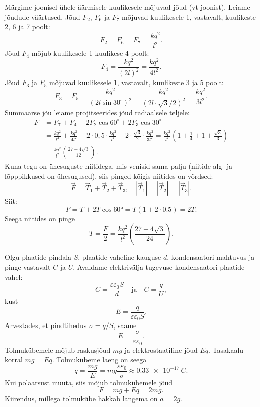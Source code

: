 \documentclass[10pt, twoside]{article}
\begin{document}
{Märgime joonisel ühele äärmisele kuulikesele mõjuvad jõud (vt joonist). Leiame jõudude väärtused. Jõud $F_2$, $F_6$ ja $F_7$ mõjuvad kuulikesele 1, vastavalt, kuulikeste 2, 6 ja 7 poolt:
\[
F_2 = F_6 = F_7 = \frac{kq^2}{l^2}.
\]
Jõud $F_4$ mõjub kuulikesele 1 kuulikese 4 poolt:
\[
F_{4}=\frac{k q^{2}}{(2 l)^{2}}=\frac{k q^{2}}{4 l^{2}}.
\]
Jõud $F_3$ ja $F_5$ mõjuvad kuulikesele 1, vastavalt, kuulikeste 3 ja 5 poolt:
\[
F_{3}=F_{5}=\frac{k q^{2}}{\left(2 l \sin 30^{\circ}\right)^{2}}=\frac{k q^{2}}{(2 l \cdot \sqrt{3} / 2)^{2}}=\frac{k q^{2}}{3 l^{2}}.
\]
Summaarse jõu leiame projitseerides jõud radiaalsele teljele:
\[
\begin{aligned}
F&=F_{7}+F_{4}+2 F_{2} \cos 60^{\circ}+2 F_{3} \cos 30^{\circ}\\
&=\frac{k q^{2}}{l^{2}}+\frac{k q^{2}}{4 l^{2}}+2 \cdot 0,5 \cdot \frac{k q^{2}}{l^{2}}+2 \cdot \frac{\sqrt{3}}{2} \cdot \frac{k q^{2}}{3 l^{2}}=\frac{k q^{2}}{l^{2}}\left(1+\frac{1}{4}+1+\frac{\sqrt{3}}{3}\right)\\
&=\frac{k q^{2}}{l^{2}}\left(\frac{27+4 \sqrt{3}}{12}\right).
\end{aligned}
\]
Kuna tegu on ühesuguste niitidega, mis venisid sama palju (niitide alg- ja lõpppikkused on ühesugused), siis pinged kõigis niitides on võrdsed: 
\[
\vec{F}=\vec{T}_{1}+\vec{T}_{2}+\vec{T}_{3}, \quad\left|\vec{T}_{1}\right|=\left|\vec{T}_{2}\right|=\left|\vec{T}_{3}\right|.
\]
Siit:
\[
F = T + 2T \cos \ang{60} = T (\num{1} + \num{2} \cdot \num{0,5}) = 2T.
\]
Seega niitides on pinge
\[
T=\frac{F}{2}=\frac{k q^{2}}{l^{2}}\left(\frac{27+4 \sqrt{3}}{24}\right).
\]
\probend
\bigskip


\solu
Olgu plaatide pindala $S$, plaatide vaheline kauguse $d$, kondensaatori mahtuvus ja pinge vastavalt $C$ ja $U$. Avaldame elektrivälja tugevuse kondensaatori plaatide vahel:
\[
C=\frac{\varepsilon \varepsilon_{0} S}{d} \quad \text{ja} \quad C=\frac{q}{U},
\]
kust
\[
E=\frac{q}{\varepsilon \varepsilon_{0} S}.
\]
Arvestades, et pindtihedus $\sigma = q/S$, saame
\[
E = \frac{\sigma}{\varepsilon\varepsilon_0}.
\]
Tolmukübemele mõjub raskusjõud $mg$ ja elektrostaatiline jõud $Eq$. Tasakaalu korral $mg = Eq$. Tolmukübeme laeng on seega
\[
q=\frac{m g}{E}=m g \frac{\varepsilon \varepsilon_{0}}{\sigma} \approx \SI{0,33e-17}{C}.
\]
Kui polaarsust muuta, siis mõjub tolmukübemele jõud
\[
F = mg + Eq = 2mg.
\]
Kiirendus, millega tolmukübe hakkab langema on $a = 2g$.
\probend
\bigskip

}
\end{document}
